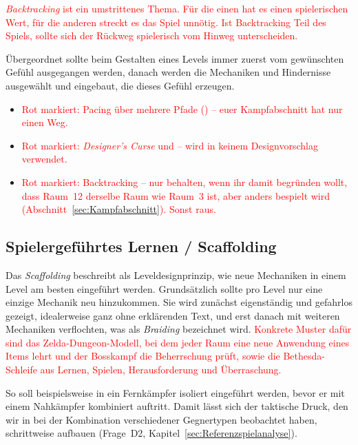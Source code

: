 \documentclass[../Main.tex]{subfiles}
\begin{document}
\textcolor{red}{\textit{Backtracking} ist ein umstrittenes Thema. Für die einen hat es einen spielerischen Wert, für die anderen streckt es das Spiel unnötig. Ist Backtracking Teil des Spiels, sollte sich der Rückweg spielerisch vom Hinweg unterscheiden.\autocite{gdc_tenprinciples2010}}

Übergeordnet sollte beim Gestalten eines Levels immer zuerst vom gewünschten Gefühl ausgegangen werden, danach werden die Mechaniken und Hindernisse ausgewählt und eingebaut, die dieses Gefühl erzeugen.\autocite{gdc_tenprinciples2010}

\begin{itemize}[leftmargin=1.5cm]
    \item \textcolor{red}{Rot markiert: Pacing über mehrere Pfade () -- euer Kampfabschnitt hat nur einen Weg.}
    \item \textcolor{red}{Rot markiert: \textit{Designer's Curse} und  -- wird in keinem Designvorschlag verwendet.}
    \item \textcolor{red}{Rot markiert: Backtracking -- nur behalten, wenn ihr damit begründen wollt, dass Raum~12 derselbe Raum wie Raum~3 ist, aber anders bespielt wird (Abschnitt~\ref{sec:Kampfabschnitt}). Sonst raus.}
\end{itemize}

\subsection{Spielergeführtes Lernen / Scaffolding} \label{sec:Scaffolding}
Das \textit{Scaffolding} beschreibt als Leveldesignprinzip, wie neue Mechaniken in einem Level am besten eingeführt werden.\autocite[114]{totten2014architectural} Grundsätzlich sollte pro Level nur eine einzige Mechanik neu hinzukommen.\autocite{gdc_tenprinciples2010} Sie wird zunächst eigenständig und gefahrlos gezeigt, idealerweise ganz ohne erklärenden Text, und erst danach mit weiteren Mechaniken verflochten, was als \textit{Braiding} bezeichnet wird.\autocite{gdc_movingmountains2020} \textcolor{red}{Konkrete Muster dafür sind das Zelda-Dungeon-Modell, bei dem jeder Raum eine neue Anwendung eines Items lehrt und der Bosskampf die Beherrschung prüft, sowie die Bethesda-Schleife aus Lernen, Spielen, Herausforderung und Überraschung.\autocite{gdc_tenprinciples2010}}

So soll beispielsweise in  ein Fernkämpfer isoliert eingeführt werden, bevor er mit einem Nahkämpfer kombiniert auftritt. Damit lässt sich der taktische Druck, den wir in  bei der Kombination verschiedener Gegnertypen beobachtet haben, schrittweise aufbauen (Frage~D2, Kapitel~\ref{sec:Referenzspielanalyse}).
\end{document}
